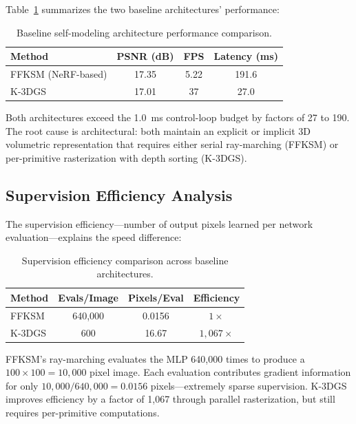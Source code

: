 \documentclass[12pt,a4paper,oneside]{report}
\begin{document}
Table~\ref{tab:baseline_comparison} summarizes the two baseline architectures' performance:
\begin{table}[H]
\centering

\caption{Baseline self-modeling architecture performance comparison.}
\label{tab:baseline_comparison}
\begin{tabular}{lccc}
\toprule

\textbf{Method} & \textbf{PSNR (dB)} & \textbf{FPS} & \textbf{Latency (ms)} \\
\midrule

FFKSM (NeRF-based) & 17.35 & 5.22 & 191.6 \\

K-3DGS & 17.01 & 37 & 27.0 \\
\bottomrule

\end{tabular}
\end{table}

Both architectures exceed the 1.0~ms control-loop budget by factors of 27 to 190. The root cause is architectural: both maintain an explicit or implicit 3D volumetric representation that requires either serial ray-marching (FFKSM) or per-primitive rasterization with depth sorting (K-3DGS).
\subsection{Supervision Efficiency Analysis}
\label{subsec:supervision_efficiency_analysis}

The supervision efficiency---number of output pixels learned per network evaluation---explains the speed difference:
\begin{table}[H]
\centering

\caption{Supervision efficiency comparison across baseline architectures.}
\label{tab:supervision_efficiency_baseline}
\begin{tabular}{lccc}
\toprule

\textbf{Method} & \textbf{Evals/Image} & \textbf{Pixels/Eval} & \textbf{Efficiency} \\
\midrule

FFKSM & 640,000 & 0.0156 & $1\times$ \\

K-3DGS & 600 & 16.67 & $1,067\times$ \\
\bottomrule

\end{tabular}
\end{table}

FFKSM's ray-marching evaluates the MLP 640,000 times to produce a $100 \times 100 = 10,000$ pixel image. Each evaluation contributes gradient information for only $10,000 / 640,000 = 0.0156$ pixels---extremely sparse supervision. K-3DGS improves efficiency by a factor of 1,067 through parallel rasterization, but still requires per-primitive computations.
\end{document}
